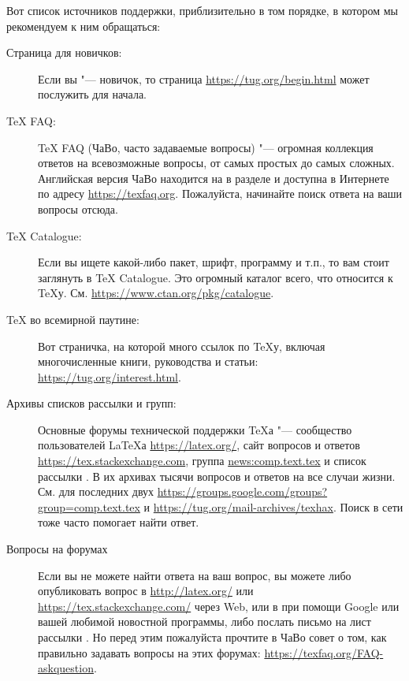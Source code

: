 \documentclass{article}
\begin{document}
Вот список источников поддержки, приблизительно в том порядке, в
котором мы рекомендуем к ним обращаться:

\begin{description}

\item[Страница для новичков:] Если вы "--- новичок, то страница
  \url{https://tug.org/begin.html} может послужить для начала.
  
\item [\TeX{} FAQ:] \TeX{} FAQ (ЧаВо, часто задаваемые
  вопросы) "--- огромная коллекция ответов на всевозможные вопросы, от
  самых простых до самых сложных. Английская версия ЧаВо находится на
  \TL{} в разделе 
  и доступна в Интернете по адресу \url{https://texfaq.org}.
  Пожалуйста, начинайте поиск ответа на ваши вопросы отсюда.
  
\item [\TeX{} Catalogue:] Если вы ищете какой-либо пакет, шрифт,
  программу и т.п., то вам стоит заглянуть в \TeX{} Catalogue.  Это
  огромный каталог всего, что относится к \TeX{}у. См.
  \url{https://www.ctan.org/pkg/catalogue}.

\item [\TeX{} во всемирной паутине:] Вот страничка, на которой много
  ссылок по \TeX{}у, включая многочисленные книги, руководства и
  статьи: \url{https://tug.org/interest.html}.
  
\item [Архивы списков рассылки и групп:] Основные форумы технической
  поддержки \TeX а "--- сообщество пользователей \LaTeX а
  \url{https://latex.org/}, сайт вопросов и ответов
  \url{https://tex.stackexchange.com}, группа \url{news:comp.text.tex} и
  список рассылки .  В их архивах тысячи
  вопросов и ответов на все случаи жизни. См. для последних двух
  \url{https://groups.google.com/groups?group=comp.text.tex} и
  \url{https://tug.org/mail-archives/texhax}.  Поиск в сети тоже часто
  помогает найти ответ. 
  
\item [Вопросы на форумах] Если вы не можете найти ответа на ваш
  вопрос, вы можете либо опубликовать вопрос в
  \url{http://latex.org/} или
  \url{https://tex.stackexchange.com/} через Web, или в 
  при помощи Google или вашей любимой новостной программы, либо
  послать письмо на лист рассылки . Но перед
  этим пожалуйста прочтите в ЧаВо совет о том, как правильно
  задавать вопросы на этих форумах:
  \url{https://texfaq.org/FAQ-askquestion}.
  

\end{description}
\end{document}
